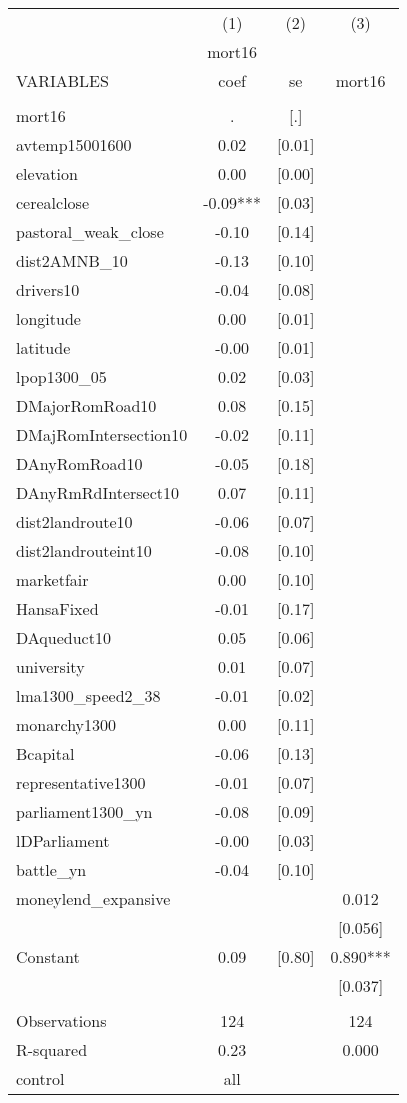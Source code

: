 \documentclass[landscape]{article}
\begin{document}
\begin{tabular}{lccc} \hline
 & (1) & (2) & (3) \\
 & mort16 &  &  \\
VARIABLES & coef & se & mort16 \\ \hline
 &  &  &  \\
mort16 & . & [.] &  \\
avtemp15001600 & 0.02 & [0.01] &  \\
elevation & 0.00 & [0.00] &  \\
cerealclose & -0.09*** & [0.03] &  \\
pastoral\_weak\_close & -0.10 & [0.14] &  \\
dist2AMNB\_10 & -0.13 & [0.10] &  \\
drivers10 & -0.04 & [0.08] &  \\
longitude & 0.00 & [0.01] &  \\
latitude & -0.00 & [0.01] &  \\
lpop1300\_05 & 0.02 & [0.03] &  \\
DMajorRomRoad10 & 0.08 & [0.15] &  \\
DMajRomIntersection10 & -0.02 & [0.11] &  \\
DAnyRomRoad10 & -0.05 & [0.18] &  \\
DAnyRmRdIntersect10 & 0.07 & [0.11] &  \\
dist2landroute10 & -0.06 & [0.07] &  \\
dist2landrouteint10 & -0.08 & [0.10] &  \\
marketfair & 0.00 & [0.10] &  \\
HansaFixed & -0.01 & [0.17] &  \\
DAqueduct10 & 0.05 & [0.06] &  \\
university & 0.01 & [0.07] &  \\
lma1300\_speed2\_38 & -0.01 & [0.02] &  \\
monarchy1300 & 0.00 & [0.11] &  \\
Bcapital & -0.06 & [0.13] &  \\
representative1300 & -0.01 & [0.07] &  \\
parliament1300\_yn & -0.08 & [0.09] &  \\
lDParliament & -0.00 & [0.03] &  \\
battle\_yn & -0.04 & [0.10] &  \\
moneylend\_expansive &  &  & 0.012 \\
 &  &  & [0.056] \\
Constant & 0.09 & [0.80] & 0.890*** \\
 &  &  & [0.037] \\
 &  &  &  \\
Observations & 124 &  & 124 \\
R-squared & 0.23 &  & 0.000 \\
 control & all &  &  \\ \hline
\end{tabular}
\end{document}

